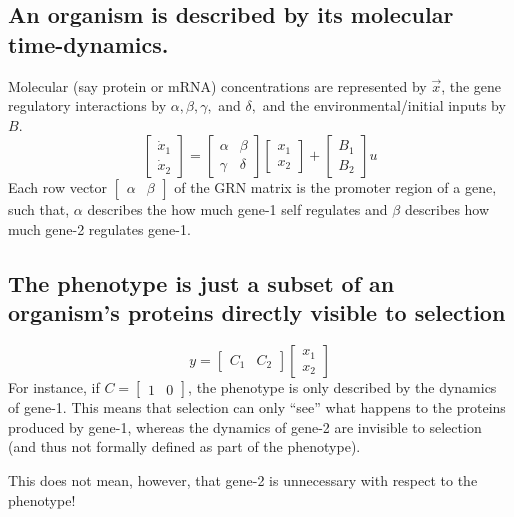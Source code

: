 \documentclass{seminar}
\begin{document}
  \begin{slide}
    \section*{An organism is described by its molecular time-dynamics.}
      Molecular (say protein or mRNA) concentrations are represented by $\vec{x}$, the gene regulatory interactions by $\alpha, \beta, \gamma,$ and $\delta,$ and the environmental/initial inputs by $B$.  
      \begin{equation*}
        \begin{bmatrix} \dot{x}_{1} \\ \dot{x}_{2} \end{bmatrix} = \begin{bmatrix} \alpha & \beta \\ \gamma & \delta \end{bmatrix} \begin{bmatrix} x_{1} \\ x_{2} \end{bmatrix} + \begin{bmatrix} B_{1} \\ B_{2} \end{bmatrix} u
      \end{equation*}
    Each row vector $\begin{bmatrix} \alpha & \beta \end{bmatrix}$ of the GRN matrix is the promoter region of a gene, such that, $\alpha$ describes the how much gene-1 self regulates and $\beta$ describes how much gene-2 regulates gene-1. 
  \end{slide}

  \begin{slide}
    \section*{The phenotype is just a subset of an organism's proteins directly visible to selection}
    \begin{equation*}
      y = \begin{bmatrix} C_{1} & C_{2} \end{bmatrix} \begin{bmatrix} x_{1} \\ x_{2} \end{bmatrix}
    \end{equation*}
    For instance, if $C = \begin{bmatrix} 1 & 0 \end{bmatrix}$, the phenotype is only described by the dynamics of gene-1. This means that selection can only ``see'' what happens to the proteins produced by gene-1, whereas the dynamics of gene-2 are invisible to selection (and thus not formally defined as part of the phenotype).
      
      This does not mean, however, that gene-2 is unnecessary with respect to the phenotype!
  \end{slide}
\end{document}
